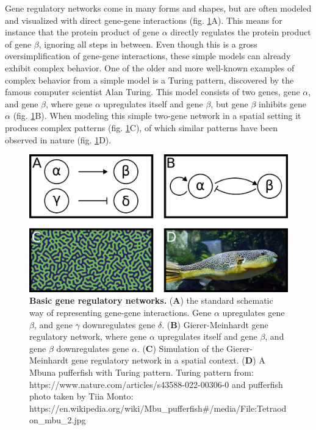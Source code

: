 Gene regulatory networks come in many forms and shapes, but are often modeled and visualized with direct gene-gene interactions (fig. \ref{fig:network}A). This means for instance that the protein product of gene $\alpha$ directly regulates the protein product of gene $\beta$, ignoring all steps in between. Even though this is a gross oversimplification of gene-gene interactions, these simple models can already exhibit complex behavior. One of the older and more well-known examples of complex behavior from a simple model is a Turing pattern, discovered by the famous computer scientist Alan Turing\cite{Turing1952}. This model consists of two genes, gene $\alpha$, and gene $\beta$, where gene $\alpha$ upregulates itself and gene $\beta$, but gene $\beta$ inhibits gene $\alpha$ (fig. \ref{fig:network}B). When modeling this simple two-gene network in a spatial setting it produces complex patterns (fig. \ref{fig:network}C), of which similar patterns have been observed in nature (fig. \ref{fig:network}D).

\begin{figure}[H]
    \includegraphics[width=\linewidth]{ch.introduction/imgs/network.png}
    \caption{\textbf{Basic gene regulatory networks.} (\textbf{A}) the standard schematic way of representing gene-gene interactions. Gene $\alpha$ upregulates gene $\beta$, and gene $\gamma$ downregulates gene $\delta$. (\textbf{B}) Gierer-Meinhardt gene regulatory network, where gene $\alpha$ upregulates itself and gene $\beta$, and gene $\beta$ downregulates gene $\alpha$. (\textbf{C}) Simulation of the Gierer-Meinhardt gene regulatory network in a spatial context. (\textbf{D}) A Mbuna pufferfish with Turing pattern. Turing pattern from: https://www.nature.com/articles/s43588-022-00306-0 and pufferfish photo taken by Tiia Monto: https://en.wikipedia.org/wiki/Mbu\_pufferfish\#/media/File:Tetraodon\_mbu\_2.jpg}
    \label{fig:network}
\end{figure}

